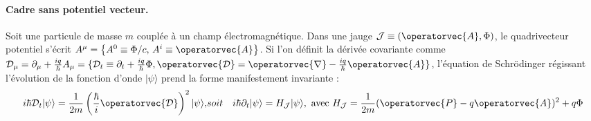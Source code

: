 
\paragraph{Cadre sans potentiel vecteur.}

Soit une particule de masse $m$ couplée à un champ électromagnétique. Dans une jauge $\mathcal{J} \equiv (\operatorvec{A}, \Phi)$, le quadrivecteur potentiel s’écrit $A^\mu = \left\{ A^0 \equiv \Phi/c,\, A^i \equiv \operatorvec{A} \right\}$. Si l’on définit la dérivée covariante comme $\mathcal{D}_\mu = \partial_\mu + \frac{iq}{\hbar} A_\mu = \{ \mathcal{D}_t \equiv \partial_t + \frac{iq}{\hbar} \Phi , \operatorvec{\mathcal{D}} = \operatorvec{\nabla} - \frac{iq}{\hbar} \operatorvec{A}  \} $, l’équation de Schrödinger régissant l’évolution de la fonction d’onde $\vert \psi \rangle$  prend la forme manifestement invariante :
\begin{eqnarray*}
	i\hbar \mathcal{D}_t \vert \psi \rangle = \frac{1}{2m} \left( \frac{\hbar}{i} \operatorvec{\mathcal{D}} \right)^2 \vert \psi \rangle, & soit &  i\hbar \partial_t \vert \psi \rangle = H_{\mathcal{J}} \vert \psi \rangle , ~\mbox{avec}~	H_{\mathcal{J}} = \frac{1}{2m} (\operatorvec{P} - q \operatorvec{A})^2 + q\Phi
\end{eqnarray*}





